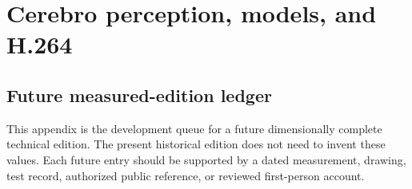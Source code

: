 \documentclass[10pt,openany]{book}
\begin{document}
\part{Cerebro perception, models, and H.264}

\appendix



\chapter{Future measured-edition ledger}

This appendix is the development queue for a future dimensionally complete technical edition. The present historical edition does not need to invent these values. Each future entry should be supported by a dated measurement, drawing, test record, authorized public reference, or reviewed first-person account.
\end{document}
